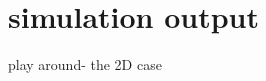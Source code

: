 \documentclass[11pt,compress,xcolor=x11names,UTF8]{beamer}
\begin{document}
\section{simulation output }
\begin{frame}{play around- the 2D case}
	
\end{frame}

\end{document}
